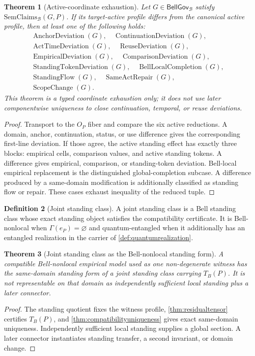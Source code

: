 \documentclass[11pt]{article}
\newtheorem{theorem}{Theorem}[section]
\theoremstyle{definition}
\newtheorem{definition}[theorem]{Definition}
\newcommand{\Bell}{\mathcal{B}}
\newcommand{\GlobalSec}{\Gamma}
\newcommand{\BellGov}{\mathsf{BellGov}_{\Bell}}
\newcommand{\SemClaims}{\mathrm{SemClaims}_{\Bell}}
\begin{document}
\begin{theorem}[Active-coordinate exhaustion]\label{thm:roleirreducibility}
Let $G\in\BellGov$ satisfy $\SemClaims(G,P)$. If its target-active profile differs from the canonical active profile, then at least one of the following holds:
\[
\begin{gathered}
\operatorname{AnchorDeviation}(G),\quad
\operatorname{ContinuationDeviation}(G),\\
\operatorname{ActTimeDeviation}(G),\quad
\operatorname{ReuseDeviation}(G),\\
\operatorname{EmpiricalDeviation}(G),\quad
\operatorname{ComparisonDeviation}(G),\\
\operatorname{StandingTokenDeviation}(G),\quad
\operatorname{BellLocalCompletion}(G),\\
\operatorname{StandingFlow}(G),\quad
\operatorname{SameActRepair}(G),\\
\operatorname{ScopeChange}(G).
\end{gathered}
\]
This theorem is a typed coordinate exhaustion only; it does not use later componentwise uniqueness to close continuation, temporal, or reuse deviations.
\end{theorem}
\begin{proof}
Transport to the $O_P$ fiber and compare the six active reductions. A domain, anchor, continuation, status, or use difference gives the corresponding first-line deviation. If those agree, the active standing effect has exactly three blocks: empirical cells, comparison values, and active standing tokens. A difference gives empirical, comparison, or standing-token deviation. Bell-local empirical replacement is the distinguished global-completion subcase. A difference produced by a same-domain modification is additionally classified as standing flow or repair. These cases exhaust inequality of the reduced tuple.
\end{proof}

\begin{definition}[Joint standing class]
A joint standing class is a Bell standing class whose exact standing object satisfies the compatibility certificate. It is Bell-nonlocal when $\GlobalSec(e_P)=\varnothing$ and quantum-entangled when it additionally has an entangled realization in the carrier of \cref{def:quantumrealization}.
\end{definition}

\begin{theorem}[Joint standing class as the Bell-nonlocal standing form]\label{prop:jscnormal}
A compatible Bell-nonlocal empirical model used as one non-degenerate witness has the same-domain standing form of a joint standing class carrying $T_B(P)$. It is not representable on that domain as independently sufficient local standing plus a later connector.
\end{theorem}
\begin{proof}
The standing quotient fixes the witness profile, \cref{thm:residualtensor} certifies $T_B(P)$, and \cref{thm:compatibilityuniqueness} gives exact same-domain uniqueness. Independently sufficient local standing supplies a global section. A later connector instantiates standing transfer, a second invariant, or domain change.
\end{proof}
\end{document}

